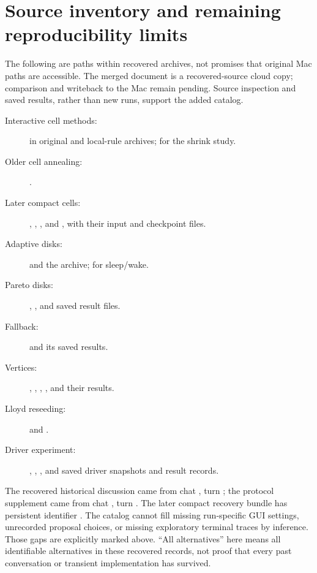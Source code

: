 \documentclass[11pt]{article}
\begin{document}
\section{Source inventory and remaining reproducibility limits}
\label{sec:source-catalog}
The following are paths within recovered archives, not promises that original
Mac paths are accessible. The merged document is a recovered-source cloud copy;
comparison and writeback to the Mac remain pending. Source inspection and
saved results, rather than new runs, support the added catalog.
\begin{description}
\item[Interactive cell methods:]  in original
and local-rule archives;  for the shrink study.
\item[Older cell annealing:] .
\item[Later compact cells:] ,
, , and
, with their input and checkpoint files.
\item[Adaptive disks:]  and the
 archive;  for sleep/wake.
\item[Pareto disks:] ,
, and saved result files.
\item[Fallback:]  and its saved results.
\item[Vertices:] , ,
, , and their results.
\item[Lloyd reseeding:]  and
.
\item[Driver experiment:] ,
, , and saved driver snapshots
and result records.
\end{description}

The recovered historical discussion came from chat
, turn
; the protocol supplement came from chat
, turn
.
The later compact recovery bundle has persistent identifier
.
The catalog cannot fill missing run-specific GUI settings, unrecorded proposal
choices, or missing exploratory terminal traces by inference. Those gaps are
explicitly marked above. ``All alternatives'' here means all identifiable
alternatives in these recovered records, not proof that every past conversation
or transient implementation has survived.
\end{document}
